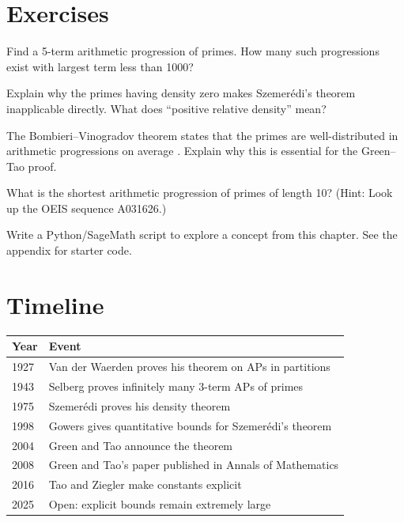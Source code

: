 \section{Exercises}

\begin{exercise}[Basic]
Find a 5-term arithmetic progression of primes. How many such progressions exist with largest term less than 1000?
\end{exercise}

\begin{exercise}[Intermediate]
Explain why the primes having density zero makes Szemer\'edi's theorem inapplicable directly. What does ``positive relative density'' mean?
\end{exercise}

\begin{exercise}[Challenge]
The Bombieri--Vinogradov theorem states that the primes are well-distributed in arithmetic progressions on average \cite{bombieri1965}. Explain why this is essential for the Green--Tao proof.
\end{exercise}

\begin{exercise}
What is the shortest arithmetic progression of primes of length 10? (Hint: Look up the OEIS sequence A031626.)
\end{exercise}


\begin{exercise}[Computational]
Write a Python/SageMath script to explore a concept from this chapter. See the appendix for starter code.
\end{exercise}

\section{Timeline}

\begin{tabularx}{\linewidth}{lX}
\toprule
\textbf{Year} & \textbf{Event} \\ \midrule
1927 & Van der Waerden proves his theorem on APs in partitions \cite{vdW1927} \\ 
1943 & Selberg proves infinitely many 3-term APs of primes \cite{selberg1943} \\ 
1975 & Szemer\'edi proves his density theorem \cite{szemeredi1975} \\ 
1998 & Gowers gives quantitative bounds for Szemer\'edi's theorem \cite{gowers2001} \\ 
2004 & Green and Tao announce the theorem \cite{greentao2008} \\ 
2008 & Green and Tao's paper published in Annals of Mathematics \\ 
2016 & Tao and Ziegler make constants explicit \cite{tao2016} \\ 
2025 & Open: explicit bounds remain extremely large \\ \bottomrule
\end{tabularx}

